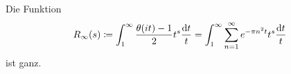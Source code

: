\begin{frame}
    \begin{lemma}
        Die Funktion 
        \[
            R_\infty(s) \coloneqq \int_1^\infty \frac{\theta(it)-1}{2} t^s \frac{\mathrm{d} t}{t} = \int_1^\infty \sum_{n=1}^\infty e^{-\pi n^2 t} t^s \frac{\mathrm{d} t}{t}
        \] ist ganz.
    \end{lemma}
\end{frame}